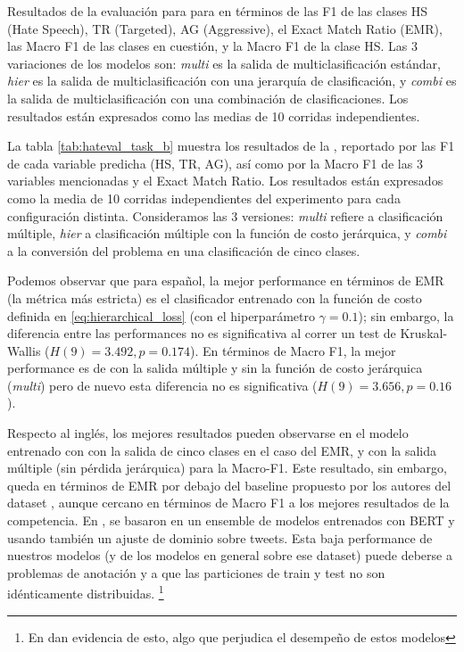 \begin{table}[ht!]
    \caption{Resultados de la evaluación para para \subtaskb{} en términos de las F1 de las clases HS (Hate Speech), TR (Targeted), AG (Aggressive), el Exact Match Ratio (EMR), las Macro F1 de las clases en cuestión, y la Macro F1 de la clase HS. Las 3 variaciones de los modelos son: \emph{multi} es la salida de multiclasificación estándar, \emph{hier} es la salida de multiclasificación con una jerarquía de clasificación, y \emph{combi} es la salida de multiclasificación con una combinación de clasificaciones. Los resultados están expresados como las medias de 10 corridas independientes.}
    \label{tab:hateval_task_b}
\end{table}


La tabla \ref{tab:hateval_task_b} muestra los resultados de la \subtaskb{}, reportado por las F1 de cada variable predicha (HS, TR, AG), así como por la Macro F1 de las 3 variables mencionadas y el Exact Match Ratio. Los resultados están expresados como la media de 10 corridas independientes del experimento para cada configuración distinta. Consideramos las 3 versiones: \emph{multi} refiere a clasificación múltiple, \emph{hier} a clasificación múltiple con la función de costo jerárquica, y \emph{combi} a la conversión del problema en una clasificación de cinco clases.

Podemos observar que para español, la mejor performance en términos de EMR (la métrica más estricta) es el clasificador entrenado con la función de costo definida en \ref{eq:hierarchical_loss} (con el hiperparámetro $\gamma = 0.1$); sin embargo, la diferencia entre las performances no es significativa al correr un test de Kruskal-Wallis ($H(9) = 3.492, p = 0.174$). En términos de Macro F1, la mejor performance es de \beto{} con la salida múltiple y sin la función de costo jerárquica (\emph{multi}) pero de nuevo esta diferencia no es significativa ($H(9) = 3.656, p=0.16$).

Respecto al inglés, los mejores resultados pueden observarse en el modelo entrenado con \bertweet{} con la salida de cinco clases en el caso del EMR, y con la salida múltiple (sin pérdida jerárquica) para la Macro-F1. Este resultado, sin embargo, queda en términos de EMR por debajo del baseline propuesto por los autores del dataset \cite{hateval2019semeval}, aunque cercano en términos de Macro F1 a los mejores resultados de la competencia. En \citet{gertner-etal-2019-mitre}, se basaron en un ensemble de modelos entrenados con BERT y usando también un ajuste de dominio sobre tweets. Esta baja performance de nuestros modelos (y de los modelos en general sobre ese dataset) puede deberse a problemas de anotación y a que las particiones de train y test no son idénticamente distribuidas. \footnote{En \citet{gertner-etal-2019-mitre} dan evidencia de esto, algo que perjudica el desempeño de estos modelos}



